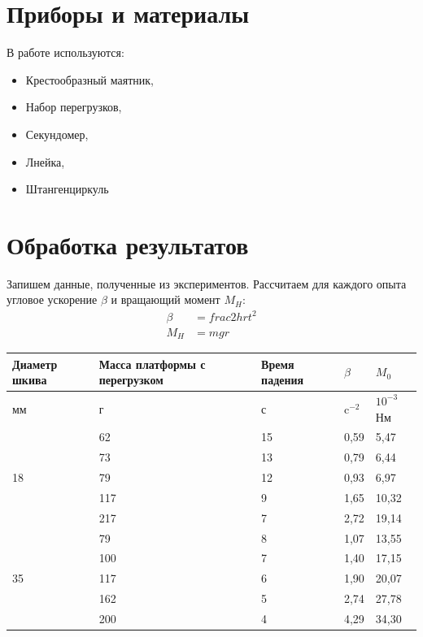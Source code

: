 \documentclass[a4paper, 12pt]{article}
\begin{document}
\section{Приборы и материалы}

В работе используются:

\begin{itemize}
	\item Крестообразный маятник,
	\item Набор перегрузков,
	\item Секундомер,
	\item Лнейка,
	\item Штангенциркуль
\end{itemize}

\section{Обработка результатов}

Запишем данные, полученные из экспериментов.
Рассчитаем для каждого опыта угловое ускорение $\beta$ и вращающий момент $M_H$:
\begin{align*}
\beta &= frac{2h}{rt^2} \\
M_H &= mgr
\end{align*}

\begin{center}
\begin{tabular}{|l|l|l|l|l|}
\hline
Диаметр шкива & Масса платформы с перегрузком & Время падения & $\beta$  & $M_0$       \\ \hline
мм            & г                             & с             & c$^{-2}$ & $10^{-3}$Нм \\ \hline
              & 62                            & 15            & 0,59     & 5,47        \\ \cline{2-5} 
              & 73                            & 13            & 0,79     & 6,44        \\ \cline{2-5} 
18            & 79                            & 12            & 0,93     & 6,97        \\ \cline{2-5} 
              & 117                           & 9             & 1,65     & 10,32       \\ \cline{2-5} 
              & 217                           & 7             & 2,72     & 19,14       \\ \hline
              & 79                            & 8             & 1,07     & 13,55       \\ \cline{2-5} 
              & 100                           & 7             & 1,40     & 17,15       \\ \cline{2-5} 
35            & 117                           & 6             & 1,90     & 20,07       \\ \cline{2-5} 
              & 162                           & 5             & 2,74     & 27,78       \\ \cline{2-5} 
              & 200                           & 4             & 4,29     & 34,30       \\ \hline
\end{tabular}
\end{center}
\end{document}
